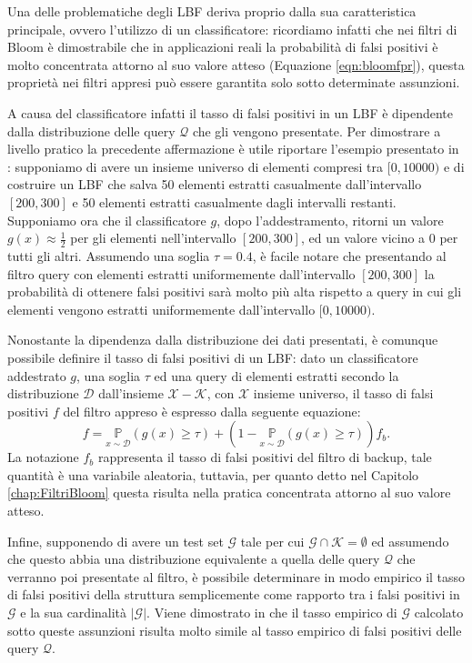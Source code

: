 \documentclass[../../main.tex]{subfiles}
\begin{document}
    
    Una delle problematiche degli LBF deriva proprio dalla sua caratteristica principale, ovvero l'utilizzo di un classificatore: ricordiamo infatti che nei filtri di Bloom è dimostrabile che in applicazioni reali la probabilità di falsi positivi è molto concentrata attorno al suo valore atteso (Equazione \eqref{eqn:bloomfpr}), questa proprietà nei filtri appresi può essere garantita solo sotto determinate assunzioni.

    A causa del classificatore infatti il tasso di falsi positivi in un LBF è dipendente dalla distribuzione delle query $\mathcal{Q}$ che gli vengono presentate. Per dimostrare a livello pratico la precedente affermazione è utile riportare l'esempio presentato in \cite{10.5555/3326943.3326986}: supponiamo di avere un insieme universo di elementi compresi tra $[0, 10000)$ e di costruire un LBF che salva 50 elementi estratti casualmente dall'intervallo $[200,300]$ e 50 elementi estratti casualmente dagli intervalli restanti. Supponiamo ora che il classificatore $g$, dopo l'addestramento, ritorni un valore $g(x) \approx \frac{1}{2}$ per gli elementi nell'intervallo $[200,300]$, ed un valore vicino a 0 per tutti gli altri. Assumendo una soglia $\tau = 0.4$, è facile notare che presentando al filtro query con elementi estratti uniformemente dall'intervallo $[200,300]$ la probabilità di ottenere falsi positivi sarà molto più alta rispetto a query in cui gli elementi vengono estratti uniformemente dall'intervallo $[0, 10000)$.

    Nonostante la dipendenza dalla distribuzione dei dati presentati, è comunque possibile definire il tasso di falsi positivi di un LBF: dato un classificatore addestrato $g$, una soglia $\tau$ ed una query di elementi estratti secondo la distribuzione $\mathcal{D}$ dall'insieme $\mathcal{X} - \mathcal{K}$, con $\mathcal{X}$ insieme universo, il tasso di falsi positivi $f$ del filtro appreso è espresso dalla seguente equazione:
    \begin{equation}
        f = \underset{x \sim \mathcal{D}}{\mathbb{P}}(g(x) \geq \tau) + (1 - \underset{x \sim \mathcal{D}}{\mathbb{P}}(g(x) \geq \tau))f_b.
        \label{eqn:LBFFalsiPositivi}
    \end{equation} 
    La notazione $f_b$ rappresenta il tasso di falsi positivi del filtro di backup, tale quantità è una variabile aleatoria, tuttavia, per quanto detto nel Capitolo \ref{chap:FiltriBloom} questa risulta nella pratica concentrata attorno al suo valore atteso.

    Infine, supponendo di avere un test set $\mathcal{G}$ tale per cui $\mathcal{G} \cap \mathcal{K} = \emptyset$ ed assumendo che questo abbia una distribuzione equivalente a quella delle query $\mathcal{Q}$ che verranno poi presentate al filtro, è possibile determinare in modo empirico il tasso di falsi positivi della struttura semplicemente come rapporto tra i falsi positivi in $\mathcal{G}$ e la sua cardinalità $|\mathcal{G}|$. Viene dimostrato in \cite{10.5555/3326943.3326986} che il tasso empirico di $\mathcal{G}$ calcolato sotto queste assunzioni risulta molto simile al tasso empirico di falsi positivi delle query $\mathcal{Q}$. 
    
\end{document}
